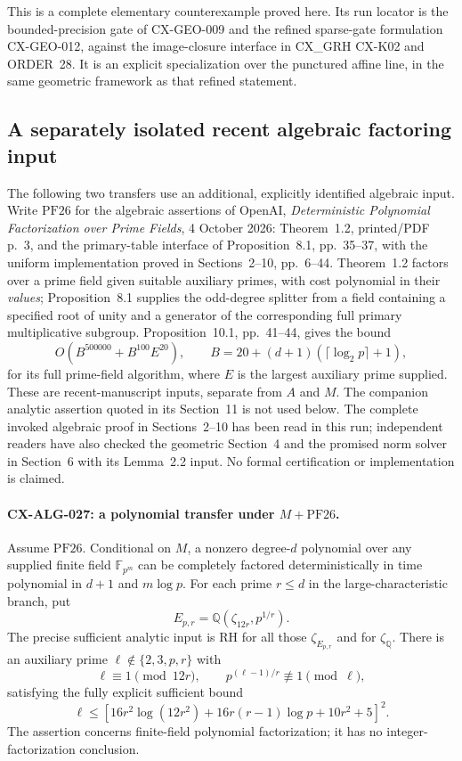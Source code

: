 This is a complete elementary counterexample proved here. Its run
locator is the bounded-precision gate of CX-GEO-009 and the refined
sparse-gate formulation CX-GEO-012, against the image-closure interface
in CX\_GRH CX-K02 and ORDER~28. It is an explicit specialization over
the punctured affine line, in the same geometric framework as that
refined statement.

\subsection{A separately isolated recent algebraic factoring input}

The following two transfers use an additional, explicitly identified
algebraic input. Write $\mathrm{PF26}$ for the algebraic assertions of
OpenAI, \emph{Deterministic Polynomial Factorization over Prime Fields},
4 October 2026: Theorem~1.2, printed/PDF p.~3, and the primary-table
interface of Proposition~8.1, pp.~35--37, with the uniform implementation
proved in Sections~2--10, pp.~6--44. Theorem~1.2 factors over a prime
field given suitable auxiliary primes, with cost polynomial in their
\emph{values}; Proposition~8.1 supplies the odd-degree splitter from a
field containing a specified root of unity and a generator of the
corresponding full primary multiplicative subgroup. Proposition~10.1,
pp.~41--44, gives the bound
\[
                  O(B^{500000}+B^{100}E^{20}),
\qquad B=20+(d+1)(\lceil\log_2p\rceil+1),
\]
for its full prime-field algorithm, where $E$ is the largest auxiliary
prime supplied. These are recent-manuscript inputs, separate from $A$
and $M$. The companion analytic assertion quoted in its Section~11 is
not used below. The complete invoked algebraic proof in Sections~2--10
has been read in this run; independent readers have also checked the
geometric Section~4 and the promised norm solver in Section~6 with its
Lemma~2.2 input. No formal certification or implementation is claimed.

\paragraph{CX-ALG-027: a polynomial transfer under $M+\mathrm{PF26}$.}
Assume $\mathrm{PF26}$. Conditional on $M$, a nonzero degree-$d$ polynomial
over any supplied finite field $\mathbb F_{p^m}$ can be completely
factored deterministically in time polynomial in $d+1$ and
$m\log p$. For each prime $r\le d$ in the large-characteristic
branch, put
\[
 E_{p,r}=\mathbb Q(\zeta_{12r},p^{1/r}).
\]
The precise sufficient analytic input is RH for all those
$\zeta_{E_{p,r}}$ and for $\zeta_{\mathbb Q}$.
There is an auxiliary prime $\ell\notin\{2,3,p,r\}$ with
\[
 \ell\equiv1\pmod{12r},\qquad
 p^{(\ell-1)/r}\not\equiv1\pmod\ell,
\]
satisfying the fully explicit sufficient bound
\[
 \ell\le
 \left[16r^2\log(12r^2)+16r(r-1)\log p+10r^2+5\right]^2.
 \tag{CX-PF26-prime}
\]
The assertion concerns finite-field polynomial factorization; it has
no integer-factorization conclusion.

